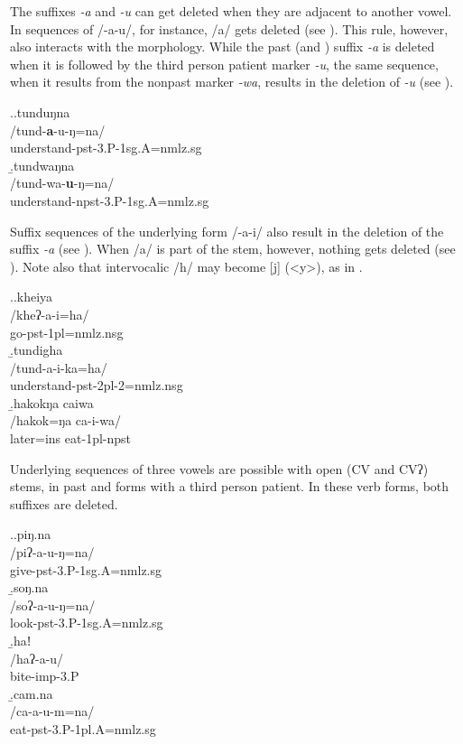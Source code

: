 The suffixes \emph{-a} and \emph{-u} can get deleted when they are adjacent to another vowel. In sequences of /-a-u/, for instance, /a/ gets deleted (see \Next[a]). This rule, however, also interacts with the morphology. While the past (and ) suffix \emph{-a} is deleted when it is followed by the third person patient marker \emph{-u}, the same sequence, when it results from the nonpast marker \emph{-wa}, results in the deletion of \emph{-u} (see \Next[b]).   

\ex.\a.\glll tunduŋna\\
/tund-\textbf{a}-u-ŋ=na/\\
understand{\sc -pst-3.P-1sg.A=nmlz.sg}\\
\b.\glll  tundwaŋna\\
/tund-wa-\textbf{u}-ŋ=na/\\
understand{\sc -npst-3.P-1sg.A=nmlz.sg}\\


Suffix sequences of the underlying form /-a-i/ also result in the deletion of the suffix \emph{-a} (see \Next). When /a/ is part of the stem, however, nothing gets deleted (see \Next[c]).  Note also that intervocalic /h/ may become [j] (<y>), as in \Next[a].

\ex.\a.\glll kheiya\\
/kheʔ-a-i=ha/\\
go{\sc -pst-1pl=nmlz.nsg}\\
\b.\glll  tundigha\\
/tund-a-i-ka=ha/\\
understand{\sc [3.A]-pst-2pl-2=nmlz.nsg}\\
\b.\glll hakokŋa caiwa\\
/hakok=ŋa ca-i-wa/\\
later{\sc =ins} eat{\sc -1pl-npst}\\

Underlying sequences of three vowels are possible with open (CV and CVʔ) stems, in past and  forms with a third person patient. In these verb forms, both suffixes are deleted. 

\ex.\a.\glll piŋ.na\\
/piʔ-a-u-ŋ=na/\\
give{\sc -pst-3.P-1sg.A=nmlz.sg}\\
\b.\glll  soŋ.na\\
/soʔ-a-u-ŋ=na/\\
look{\sc -pst-3.P-1sg.A=nmlz.sg}\\
\b.\glll  haǃ\\
/haʔ-a-u/\\
bite{\sc -imp-3.P}\\
\b.\glll  cam.na\\
/ca-a-u-m=na/\\
eat{\sc -pst-3.P-1pl.A=nmlz.sg}\\


